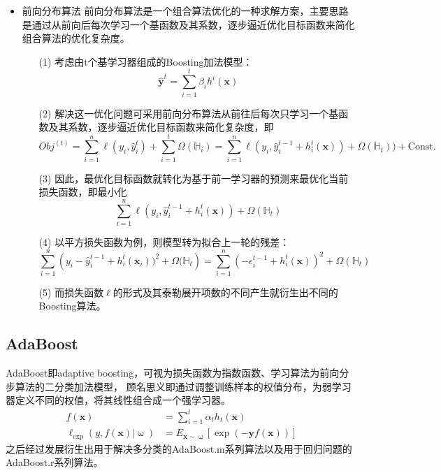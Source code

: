 \documentclass[a4paper]{article}
\begin{document}
\begin{itemize}
		\item 前向分布算法
		前向分布算法是一个组合算法优化的一种求解方案，主要思路是通过从前向后每次学习一个基函数及其系数，逐步逼近优化目标函数来简化组合算法的优化复杂度。
			\begin{itemize}
				\item[(1)] 	考虑由t个基学习器组成的Boosting加法模型：$$\hat{\mathbf{y}}^t = \sum_{i=1}^{t}\beta_{i}h^i(\textbf{x})$$
				\item[(2)]	解决这一优化问题可采用前向分布算法从前往后每次只学习一个基函数及其系数，逐步逼近优化目标函数来简化复杂度，即
				$${Obj}^{(t)} = \sum_{i=1}^{n}\ell\left(y_i, \hat{y}_i^t\right)+\sum_{i=1}^{t}\Omega(\mathbb{H}_i) 
								   = \sum_{i=1}^{n}\ell\left(y_i, \hat{y}_{i}^{t-1}+h_i^t(\textbf{x})\right)+\Omega(\mathbb{H}_t))+\text{Const.}$$
				\item[(3)]	因此，最优化目标函数就转化为基于前一学习器的预测来最优化当前损失函数，即最小化
				$$\sum_{i=1}^{n}\ell\left(y_i, \hat{y}_{i}^{t-1}+h_i^t(\textbf{x})\right)+\Omega(\mathbb{H}_t)$$
				\item[(4)]	以平方损失函数为例，则模型转为拟合上一轮的残差：
				$$\sum_{i=1}^{n}\left(y_i-\hat{y}_{i}^{t-1}+h_i^t(\mathbf{x}_i))^2+\Omega(\mathbb{H}_t\right) 
						= \sum_{i=1}^{n}\left(-\epsilon_i^{t-1}+h_i^t(\mathbf{x})\right)^2 + \Omega(\mathbb{H}_t)$$
				\item[(5)] 	而损失函数$\ell$的形式及其泰勒展开项数的不同产生就衍生出不同的Boosting算法。
			\end{itemize}
	\end{itemize}
	\subsection{AdaBoost}
	AdaBoost即adaptive boosting，可视为损失函数为指数函数、学习算法为前向分步算法的二分类加法模型，
	顾名思义即通过调整训练样本的权值分布，为弱学习器定义不同的权值，将其线性组合成一个强学习器。
	\begin{align*}
		f(\textbf{x}) 
			& = \sum_{i=1}^{t}\alpha_th_t(\textbf{x})\\
   		\ell_{\exp}(y,f(\textbf{x})|\upomega)
   			& = E_{\textbf{x}\sim\upomega}[\exp(-\textbf{y} f(\textbf{x}))]
	\end{align*}
	之后经过发展衍生出用于解决多分类的AdaBoost.m系列算法以及用于回归问题的AdaBoost.r系列算法。
\end{document}
